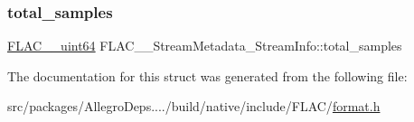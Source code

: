 \subsubsection{\texorpdfstring{total\+\_\+samples}{total\_samples}}
{\footnotesize\ttfamily \hyperlink{ordinals_8h_aa78c8c70a3eb8a58af7436f278acde8e}{F\+L\+A\+C\+\_\+\+\_\+uint64} F\+L\+A\+C\+\_\+\+\_\+\+Stream\+Metadata\+\_\+\+Stream\+Info\+::total\+\_\+samples}



The documentation for this struct was generated from the following file\+:\begin{DoxyCompactItemize}
\item 
src/packages/\+Allegro\+Deps..../build/native/include/\+F\+L\+A\+C/\hyperlink{format_8h}{format.\+h}\end{DoxyCompactItemize}
